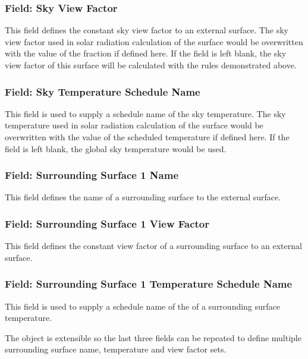 \subsubsection{Field: Sky View Factor}\label{field-sky-view-factor}

This field defines the constant sky view factor to an external surface. The sky view factor used in solar radiation calculation of the surface would be overwritten with the value of the fraction if defined here. If the field is left blank, the sky view factor of this surface will be calculated with the rules demonstrated above.

\subsubsection{Field: Sky Temperature Schedule Name}\label{field-sky-temperature-schedule-name}

This field is used to supply a schedule name of the sky temperature. The sky temperature used in solar radiation calculation of the surface would be overwritten with the value of the scheduled temperature if defined here. If the field is left blank, the global sky temperature would be used.

\subsubsection{Field: Surrounding Surface 1 Name}\label{field-surrounding-surface-1-name}

This field defines the name of a surrounding surface to the external surface.

\subsubsection{Field: Surrounding Surface 1 View Factor}\label{field-surrounding-surface-1-view-factor}

This field defines the constant view factor of a surrounding surface to an external surface.

\subsubsection{Field: Surrounding Surface 1 Temperature Schedule Name}\label{field-surrounding-surface-1-temp-schedule-name}

This field is used to supply a schedule name of the of a surrounding surface temperature.

The object is extensible so the last three fields can be repeated to define multiple surrounding surface name, temperature and view factor sets.


